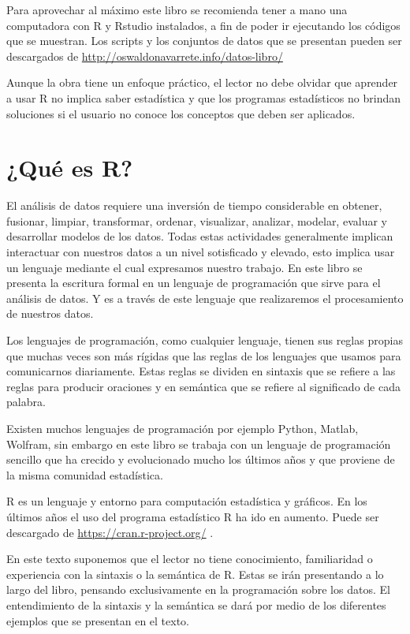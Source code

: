 \documentclass[
]{krantz}
\begin{document}
Para aprovechar al máximo este libro se recomienda tener a mano una computadora con R y Rstudio instalados, a fin de poder ir ejecutando los códigos que se muestran. Los scripts y los conjuntos de datos que se presentan pueden ser descargados de \url{http://oswaldonavarrete.info/datos-libro/}

Aunque la obra tiene un enfoque práctico, el lector no debe olvidar que aprender a usar R no implica saber estadística y que los programas estadísticos no brindan soluciones si el usuario no conoce los conceptos que deben ser aplicados.

\hypertarget{que-es-r}{%
\section{¿Qué es R?}\label{que-es-r}}

El análisis de datos requiere una inversión de tiempo considerable en obtener, fusionar, limpiar, transformar, ordenar, visualizar, analizar, modelar, evaluar y desarrollar modelos de los datos. Todas estas actividades generalmente implican interactuar con nuestros datos a un nivel sotisficado y elevado, esto implica usar un lenguaje mediante el cual expresamos nuestro trabajo. En este libro se presenta la escritura formal en un lenguaje de programación que sirve para el análisis de datos. Y es a través de este lenguaje que realizaremos el procesamiento de nuestros datos.

Los lenguajes de programación, como cualquier lenguaje, tienen sus reglas propias que muchas veces son más rígidas que las reglas de los lenguajes que usamos para comunicarnos diariamente. Estas reglas se dividen en sintaxis que se refiere a las reglas para producir oraciones y en semántica que se refiere al significado de cada palabra.

Existen muchos lenguajes de programación por ejemplo Python, Matlab, Wolfram, sin embargo en este libro se trabaja con un lenguaje de programación sencillo que ha crecido y evolucionado mucho los últimos años y que proviene de la misma comunidad estadística.

R es un lenguaje y entorno para computación estadística y gráficos. En los últimos años el uso del programa estadístico R ha ido en aumento. Puede ser descargado de \url{https://cran.r-project.org/} \citep{R-base}.

En este texto suponemos que el lector no tiene conocimiento, familiaridad o experiencia con la sintaxis o la semántica de R. Estas se irán presentando a lo largo del libro, pensando exclusivamente en la programación sobre los datos. El entendimiento de la sintaxis y la semántica se dará por medio de los diferentes ejemplos que se presentan en el texto.
\end{document}
